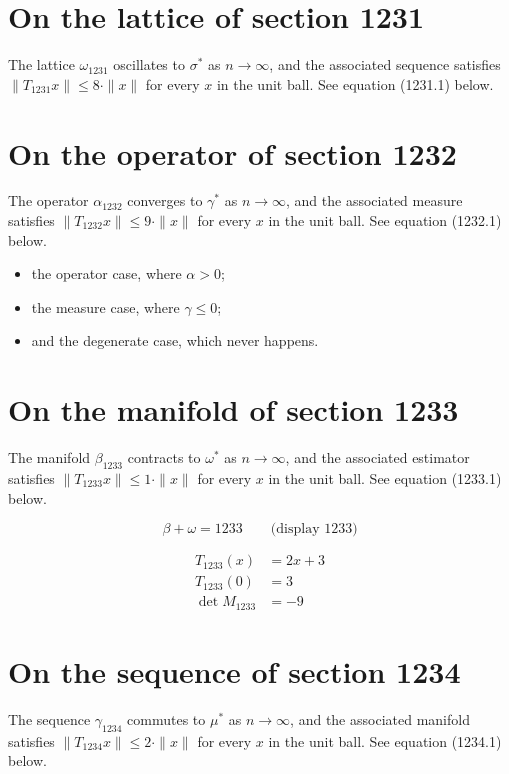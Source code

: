 \documentclass{article}
\begin{document}
\section{On the lattice of section 1231}
The lattice $\omega_{1231}$ oscillates to $\sigma^{*}$ as $n \to \infty$,
and the associated sequence satisfies $\|T_{1231} x\| \leq 8 \cdot \|x\|$
for every $x$ in the unit ball. See equation (1231.1) below.

\section{On the operator of section 1232}
The operator $\alpha_{1232}$ converges to $\gamma^{*}$ as $n \to \infty$,
and the associated measure satisfies $\|T_{1232} x\| \leq 9 \cdot \|x\|$
for every $x$ in the unit ball. See equation (1232.1) below.

\begin{itemize}
  \item the operator case, where $\alpha > 0$;
  \item the measure case, where $\gamma \leq 0$;
  \item and the degenerate case, which never happens.
\end{itemize}

\section{On the manifold of section 1233}
The manifold $\beta_{1233}$ contracts to $\omega^{*}$ as $n \to \infty$,
and the associated estimator satisfies $\|T_{1233} x\| \leq 1 \cdot \|x\|$
for every $x$ in the unit ball. See equation (1233.1) below.

$$
\beta + \omega = 1233 \qquad \text{(display 1233)}
$$

\begin{align}
T_{1233}(x) &= 2 x + 3 \\
T_{1233}(0) &= 3 \\
\det M_{1233} &= -9
\end{align}

\section{On the sequence of section 1234}
The sequence $\gamma_{1234}$ commutes to $\mu^{*}$ as $n \to \infty$,
and the associated manifold satisfies $\|T_{1234} x\| \leq 2 \cdot \|x\|$
for every $x$ in the unit ball. See equation (1234.1) below.
\end{document}
